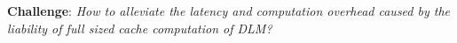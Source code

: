 \textbf{Challenge}: \textit{How to alleviate the latency and computation overhead caused by the liability of full sized cache computation of DLM?}






